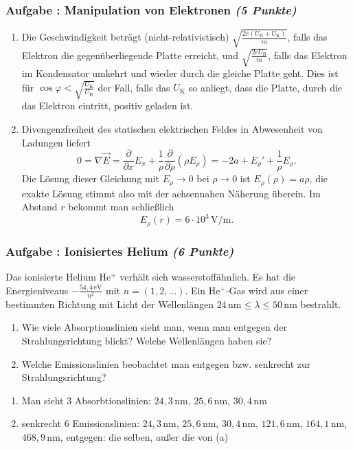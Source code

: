 \documentclass[12pt,a4paper]{article}
\newcommand{\ee}[1]{\cdot 10^{#1}}
\newcommand{\unit}[1]{\,\mathrm{#1}}
\newcommand{\pdif}[2]{\frac{\partial#1}{\partial#2}}
\newenvironment{abcenum}{\renewcommand{\labelenumi}{(\alph{enumi})} \begin{enumerate}}{\end{enumerate}\renewcommand{\labelenumi}{\theenumi .}}
\newcounter{numlabel}
\newenvironment{problem}[2]{\stepcounter{numlabel} \vspace{1ex} \subsubsection*{Aufgabe \the\value{numlabel}: #1 \emph{(#2 Punkte)}} \renewcommand{\Currentlabel}{Aufgabe \the\value{numlabel}: #1}}{

}
\begin{document}
\begin{problem}{Manipulation von Elektronen}{5}
\begin{solution}
\begin{abcenum}
\item Die Geschwindigkeit beträgt (nicht-relativistisch) $\sqrt{\frac{2e(U_\mathrm{B}+U_\mathrm{K})}{m}}$, falls das Elektron die gegen\-über\-liegende Platte erreicht, und $\sqrt{\frac{2eU_\mathrm{B}}{m}}$, falls das Elektron im Kondensator umkehrt und wieder durch die gleiche Platte geht. Dies ist für $\cos\varphi<\sqrt{\frac{U_\mathrm{K}}{U_\mathrm{B}}}$
der Fall, falls das $U_\mathrm{K}$ so anliegt, dass die Platte, durch die das Elektron eintritt, positiv geladen ist.\\
\item Divengenzfreiheit des statischen elektrischen Feldes in Abwesenheit von Ladungen liefert
\[
0 = \nabla \vec E = \pdif{}{x} E_x + \frac1\rho \pdif{}{\rho} (\rho E_\rho) = -2 a + E_\rho' + \frac{1}{\rho} E_\rho.
\]
Die Lösung dieser Gleichung mit $E_\rho \to 0$ bei $\rho \to 0$ ist $E_\rho(\rho) = a \rho$, die exakte Lösung stimmt also mit der achsennahen Näherung überein. Im Abstand $r$ bekommt man schließlich
\[
E_\rho(r)=6\ee{3}\unit{V/m}.
\]
\end{abcenum}
\end{solution}
\end{problem}


\begin{problem}{Ionisiertes Helium}{6}
Das ionisierte Helium He$^+$ verhält sich wasserstoffähnlich. Es hat die Energieniveaus
$-\frac{54,4\unit{eV}}{n^2}$ mit $n=(1,2,\ldots)$. Ein He$^+$-Gas wird aus einer bestimmten Richtung
mit Licht der Wellenlängen $24\unit{nm}\leq\lambda\leq50\unit{nm}$ bestrahlt.
\begin{abcenum}
\item Wie viele Absorptionslinien sieht man, wenn man entgegen der Strahlungsrichtung blickt? Welche Wellenlängen haben sie?
\item Welche Emissionslinien beobachtet man entgegen bzw. senkrecht zur Strahlungsrichtung?
\end{abcenum}
\begin{solution}
\begin{abcenum}
\item Man sieht 3 Absorbtionslinien: $24,3\unit{nm}$, $25,6\unit{nm}$, $30,4\unit{nm}$
\item senkrecht 6 Emissionslinien: $24,3\unit{nm}$, $25,6\unit{nm}$, $30,4\unit{nm}$, $121,6\unit{nm}$, $164,1\unit{nm}$, $468,9\unit{nm}$, entgegen: die selben, außer die von (a)
\end{abcenum}
\end{solution}
\end{problem}
\end{document}
